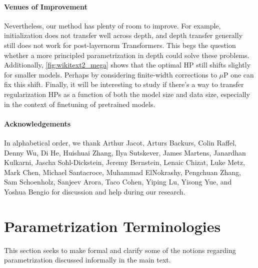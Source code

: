 \documentclass{article}
\theoremstyle{definition}
\begin{document}
\paragraph{Venues of Improvement}
Nevertheless, our method has plenty of room to improve.
For example, initialization does not transfer well across depth, and depth transfer generally still does not work for post-layernorm Transformers.
This begs the question whether a more principled parametrization in depth could solve these problems.
Additionally, \cref{fig:wikitext2_mega} shows that the optimal HP still shifts slightly for smaller models.
Perhaps by considering finite-width corrections to $\mu$P one can fix this shift.
Finally, it will be interesting to study if there's a way to transfer regularization HPs as a function of both the model size and data size, especially in the context of finetuning of pretrained models.

\newpage

\paragraph{Acknowledgements}

In alphabetical order, we thank
Arthur Jacot,
Arturs Backurs,
Colin Raffel,
Denny Wu,
Di He,
Huishuai Zhang,
Ilya Sutskever,
James Martens,
Janardhan Kulkarni,
Jascha Sohl-Dickstein,
Jeremy Bernstein,
Lenaic Chizat,
Luke Metz,
Mark Chen,
Michael Santacroce,
Muhammad ElNokrashy,
Pengchuan Zhang,
Sam Schoenholz,
Sanjeev Arora,
Taco Cohen,
Yiping Lu,
Yisong Yue, and
Yoshua Bengio
for discussion and help during our research.




\newpage
\appendix

\tableofcontents

\listoffigures

\listoftables

\newpage

\section{Parametrization Terminologies}
\label{sec:paramterminology}

This section seeks to make formal and clarify some of the notions regarding parametrization discussed informally in the main text.
\end{document}
